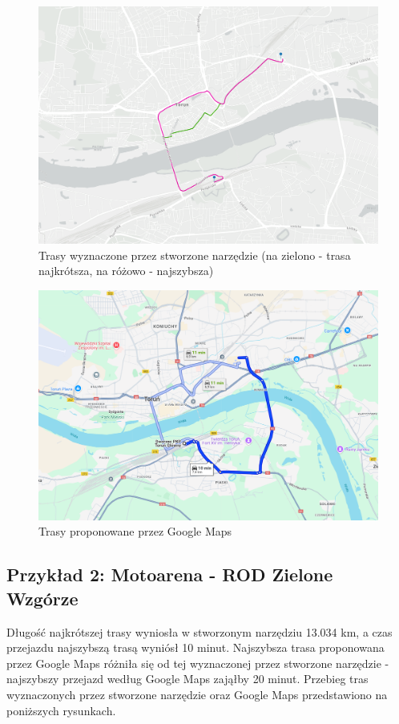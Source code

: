 \documentclass{article}
\begin{document}
\begin{figure}[H]
    \centering
    \includegraphics[width=1\textwidth]{img/glowny-copernicus.png}
    \caption{Trasy wyznaczone przez stworzone narzędzie (na zielono - trasa najkrótsza, na różowo - najszybsza)}
\end{figure}

\begin{figure}[H]
    \centering
    \includegraphics[width=1\textwidth]{img/glowny-copernicus-google.png}
    \caption{Trasy proponowane przez Google Maps}
\end{figure}

\subsection{Przykład 2: Motoarena - ROD Zielone Wzgórze}
Długość najkrótszej trasy wyniosła w stworzonym narzędziu 13.034 km, a czas przejazdu najszybszą trasą wyniósł 10 minut. Najszybsza trasa proponowana przez Google Maps różniła się od tej wyznaczonej przez stworzone narzędzie - najszybszy przejazd według Google Maps zająłby 20 minut.
Przebieg tras wyznaczonych przez stworzone narzędzie oraz Google Maps przedstawiono na poniższych rysunkach.
\end{document}
